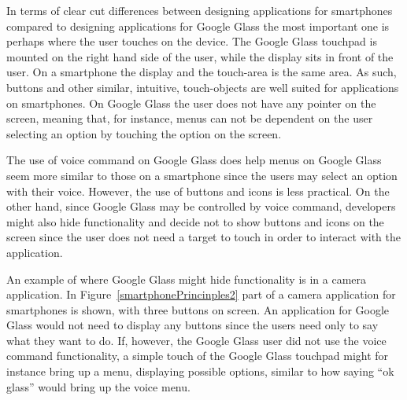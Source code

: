 


In terms of clear cut differences between designing applications for smartphones compared to designing applications for Google Glass the most important one is perhaps where the user touches on the device. The Google Glass touchpad is mounted on the right hand side of the user, while the display sits in front of the user. On a smartphone the display and the touch-area is the same area. As such, buttons and other similar, intuitive, touch-objects are well suited for applications on smartphones. On Google Glass the user does not have any pointer on the screen, meaning that, for instance, menus can not be dependent on the user selecting an option by touching the option on the screen.

The use of voice command on Google Glass does help menus on Google Glass seem more similar to those on a smartphone since the users may select an option with their voice. However, the use of buttons and icons is less practical. On the other hand, since Google Glass may be controlled by voice command, developers might also hide functionality and decide not to show buttons and icons on the screen since the user does not need a target to touch in order to interact with the application.

An example of where Google Glass might hide functionality is in a camera application. In Figure~\ref{smartphonePrincinples2} part of a camera application for smartphones is shown, with three buttons on screen. An application for Google Glass would not need to display any buttons since the users need only to say what they want to do. If, however, the Google Glass user did not use the voice command functionality, a simple touch of the Google Glass touchpad might for instance bring up a menu, displaying possible options, similar to how saying ``ok glass'' would bring up the voice menu.

